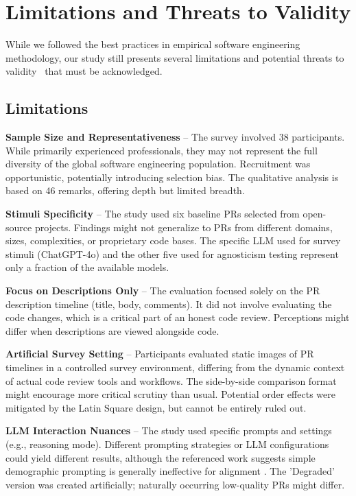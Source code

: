 \documentclass[conference]{IEEEtran}
\begin{document}
\section{Limitations and Threats to Validity}
\label{sec:discussion_limitations}

While we followed the best practices in empirical software engineering methodology\cite{ko2015practical,wieringa2014design
}, our study still presents several limitations and potential threats to validity~\cite{wohlin2012experimentation,siegmund2015views} that must be acknowledged.

\subsection{Limitations}

\textbf{Sample Size and Representativeness} -- The survey involved 38 participants. While primarily experienced professionals, they may not represent the full diversity of the global software engineering population. Recruitment was opportunistic, potentially introducing selection bias. The qualitative analysis is based on 46 remarks, offering depth but limited breadth.

\textbf{Stimuli Specificity} -- The study used six baseline PRs selected from open-source projects. Findings might not generalize to PRs from different domains, sizes, complexities, or proprietary code bases. The specific LLM used for survey stimuli (ChatGPT-4o) and the other five used for agnosticism testing represent only a fraction of the available models.

\textbf{Focus on Descriptions Only} -- The evaluation focused solely on the PR description timeline (title, body, comments). It did not involve evaluating the code changes, which is a critical part of an honest code review. Perceptions might differ when descriptions are viewed alongside code.

\textbf{Artificial Survey Setting} -- Participants evaluated static images of PR timelines in a controlled survey environment, differing from the dynamic context of actual code review tools and workflows. The side-by-side comparison format might encourage more critical scrutiny than usual. Potential order effects were mitigated by the Latin Square design, but cannot be entirely ruled out.

\textbf{LLM Interaction Nuances} -- The study used specific prompts and settings (e.g., reasoning mode). Different prompting strategies or LLM configurations could yield different results, although the referenced work suggests simple demographic prompting is generally ineffective for alignment \cite{lee2025poor}. The 'Degraded' version was created artificially; naturally occurring low-quality PRs might differ.
\end{document}

